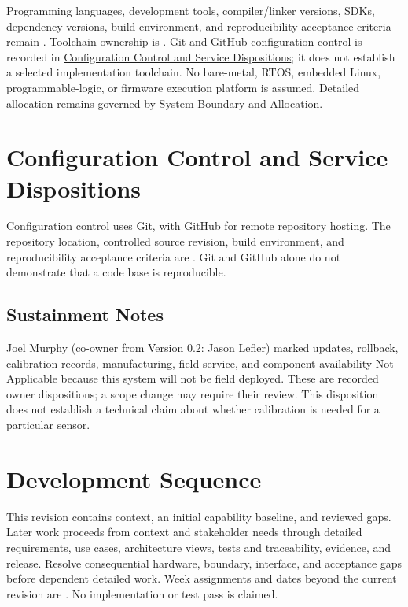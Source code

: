 Programming languages, development tools, compiler/linker versions, SDKs,
dependency versions, build environment, and reproducibility acceptance
criteria remain \OwnedTBD{}. Toolchain ownership is \OwnedTBD{}. Git and GitHub configuration
control is recorded in
\hyperref[Section:ProjectConfigurationControl]{Configuration Control and Service Dispositions};
it does not establish a selected implementation toolchain. No bare-metal,
RTOS, embedded Linux, programmable-logic, or firmware execution platform is
assumed. Detailed allocation remains governed by
\hyperref[Section:ProjectSystemBoundary]{System Boundary and Allocation}.

\section{Configuration Control and Service Dispositions}
\label{Section:ProjectConfigurationControl}
Configuration control uses Git, with GitHub for remote repository hosting.
The repository location, controlled source revision, build environment, and
reproducibility acceptance criteria are \OwnedTBD{}. Git and GitHub alone do not
demonstrate that a code base is reproducible.

\subsection{Sustainment Notes}
\label{Section:ProjectSustainmentNotes}
Joel Murphy (co-owner from Version 0.2: Jason Lefler) marked updates, rollback, calibration records, manufacturing,
field service, and component availability Not Applicable because this system
will not be field deployed. These are recorded owner dispositions; a scope
change may require their review. This disposition does not establish a
technical claim about whether calibration is needed for a particular sensor.

\section{Development Sequence}
\label{Section:ProjectDevelopmentSequence}
This revision contains context, an initial capability baseline, and reviewed
gaps. Later work proceeds from context and stakeholder needs through detailed
requirements, use cases, architecture views, tests and traceability, evidence,
and release. Resolve consequential hardware, boundary, interface, and
acceptance gaps before dependent detailed work. Week assignments and dates
beyond the current revision are \OwnedTBD{}. No implementation or test pass is claimed.


